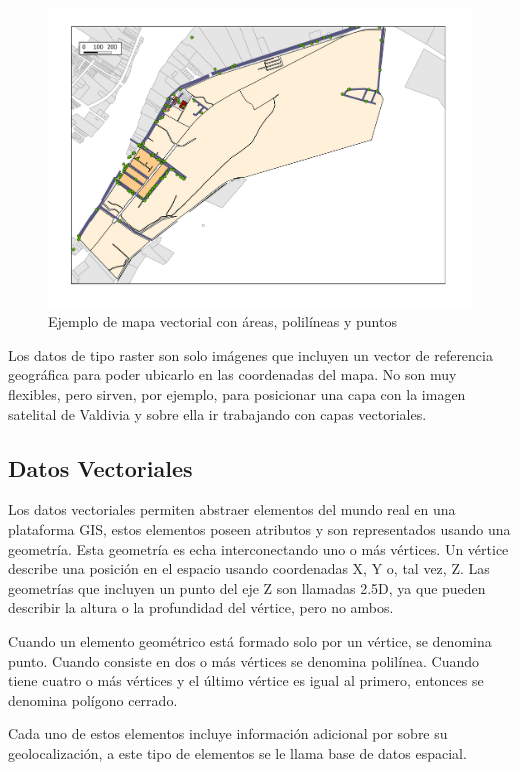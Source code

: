 \begin{figure}[h]
  \centering
  \caption{Ejemplo de mapa vectorial con áreas, polilíneas y puntos}
  \label{mapa}
  \includegraphics[scale=0.4]{mapa}
\end{figure}

Los datos de tipo raster son solo imágenes que incluyen un vector de referencia geográfica para
poder ubicarlo en las coordenadas del mapa. No son muy flexibles, pero sirven, por ejemplo, para
posicionar una capa con la imagen satelital de Valdivia y sobre ella ir trabajando con capas
vectoriales.

\subsection{Datos Vectoriales}

Los datos vectoriales permiten abstraer elementos del mundo real en una plataforma GIS, estos
elementos poseen atributos y son representados usando una geometría. Esta geometría es echa
interconectando uno o más vértices. Un vértice describe una posición en el espacio usando
coordenadas X, Y o, tal vez, Z. Las geometrías que incluyen un punto del eje Z son llamadas 2.5D, ya
que pueden describir la altura o la profundidad del vértice, pero no ambos.

Cuando un elemento geométrico está formado solo por un vértice, se denomina punto. Cuando consiste
en dos o más vértices se denomina polilínea. Cuando tiene cuatro o más vértices y el último vértice
es igual al primero, entonces se denomina polígono cerrado.

Cada uno de estos elementos incluye información adicional por sobre su geolocalización, a este tipo
de elementos se le llama base de datos espacial.

